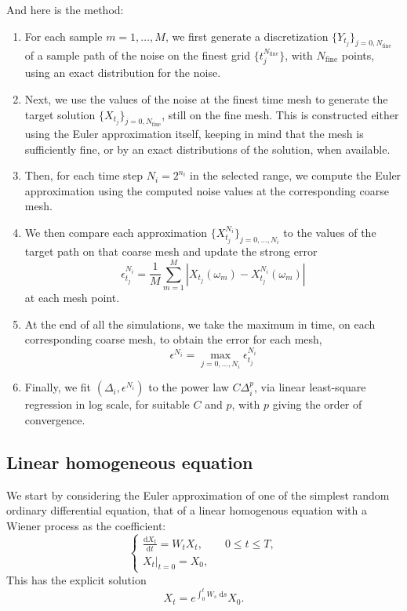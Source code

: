 \documentclass[reqno,12pt]{amsart}
\theoremstyle{plain}%
\theoremstyle{definition}
\begin{document}
And here is the method:
\begin{enumerate}
    \item For each sample $m=1, \ldots, M$, we first generate a discretization $\{Y_{t_j}\}_{j=0, N_{\mathrm{fine}}}$ of a sample path of the noise on the finest grid $\{t_j^{N_{\mathrm{fine}}}\}$, with $N_{\mathrm{fine}}$ points, using an exact distribution for the noise.
    \item Next, we use the values of the noise at the finest time mesh to generate the target solution $\{X_{t_j}\}_{j=0, N_{\mathrm{fine}}}$, still on the fine mesh. This is constructed either using the Euler approximation itself, keeping in mind that the mesh is sufficiently fine, or by an exact distributions of the solution, when available.
    \item Then, for each time step $N_i = 2^{n_i}$ in the selected range, we compute the Euler approximation using the computed noise values at the corresponding coarse mesh.
    \item We then compare each approximation $\{X_{t_j}^{N_i}\}_{j=0, \ldots, N_i}$ to the values of the target path on that coarse mesh and update the strong error
\[
    \epsilon_{t_j}^{N_i} = \frac{1}{M}\sum_{m=1}^M \left|X_{t_j}(\omega_m) - X_{t_j}^{N_i}(\omega_m)\right|
\]
at each mesh point.
    \item At the end of all the simulations, we take the maximum in time, on each corresponding coarse mesh, to obtain the error for each mesh,
\[
    \epsilon^{N_i} = \max_{j=0, \ldots, N_i} \epsilon_{t_j}^{N_i}
\]
    \item Finally, we fit $(\Delta_i, \epsilon^{N_i})$ to the power law $C\Delta_i^p$, via linear least-square regression in log scale, for suitable $C$ and $p$, with $p$ giving the order of convergence.
\end{enumerate}

\subsection{Linear homogeneous equation}
\label{seclinearhomogeneousrode}

We start by considering the Euler approximation of one of the simplest random ordinary differential equation, that of a linear homogenous equation with a Wiener process as the coefficient:
\begin{equation}
    \label{linearhomogeneousrode}
    \begin{cases}
        \displaystyle \frac{\mathrm{d}X_t}{\mathrm{d} t} = W_t X_t, \qquad 0 \leq t \leq T, \\
        \left. X_t \right|_{t = 0} = X_0,
      \end{cases}
\end{equation}
This has the explicit solution
\begin{equation}
    X_t = e^{\int_0^t W_s \;\mathrm{d}s}X_0.
\end{equation}
\end{document}
